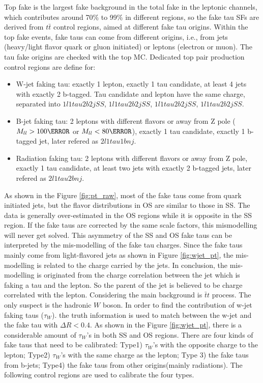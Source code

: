 Top fake is the largest fake background in the total fake in the leptonic channels, which contributes around 70\% to 99\% in different regions, so the fake tau SFs are derived from $t\bar{t}$ control regions, aimed at different fake tau origins.
Within the top fake events, fake taus can come from different origins, i.e., from jets (heavy/light flavor quark or gluon initiated) or leptons (electron or muon). The tau fake origins are checked with the top MC. Dedicated top pair production control regions are define for:
\begin{itemize}
\item{W-jet faking tau: exactly 1 lepton, exactly 1 tau candidate, at least 4 jets with exactly 2 b-tagged. Tau candidate and lepton have the same charge, separated into $1l1tau2b2j SS$, $1l1tau2b2j SS$, $1l1tau2b2j SS$, $1l1tau2b2j SS$.}
\item{B-jet faking tau: 2 leptons with different flavors or away from Z pole ($M_{ll}>100\GeV$ or $M_{ll}<80\GeV$), exactly 1 tau candidate, exactly 1 b-tagged jet, later refered as $2l1tau1bnj$.}
\item{Radiation faking tau: 2 leptons with different flavors or away from Z pole, exactly 1 tau candidate, at least two jets with exactly 2 b-tagged jets, later refered as $2l1tau2bnj$.}
\end{itemize}



As shown in the Figure \ref{fig:pt_raw}, most of the fake taus come from quark initiated jets, but the flavor distributions in OS are similar to those in SS. The data is generally over-estimated in the OS regions while it is opposite in the SS region. If the fake taus are corrected by the same scale factors, this mismodelling will never get solved. This asymmetry of the SS and OS fake taus can be interpreted by the mis-modelling of the fake tau charges. Since the fake taus mainly come from light-flavored jets as shown in Figure \ref{fig:wjet_pt}, the mis-modelling is related to the charge carried by the jets. In conclusion, the mis-modelling is originated from the charge correlation between the jet which is faking a tau and the lepton. So the parent of the jet is believed to be charge correlated with the lepton. Considering the main background is $\bar{t}t$ process. The only suspect is the hadronic $W$ boson. In order to find the contribution of w-jet faking taus ($\tau_{W}$).  the truth information is used to match between the w-jet and the fake tau with $\Delta R < 0.4$. As shown in the Figure \ref{fig:wjet_pt}, there is a considerable amount of $\tau_{W}$'s in both SS and OS regions. There are four kinds of fake taus that need to be calibrated: Type1) $\tau_{W}$'s with the opposite charge to the lepton; Type2) $\tau_{W}$'s with the same charge as the lepton; Type 3) the fake taus from b-jets; Type4) the fake taus from other origins(mainly radiations). The following control regions are used to calibrate the four types.

